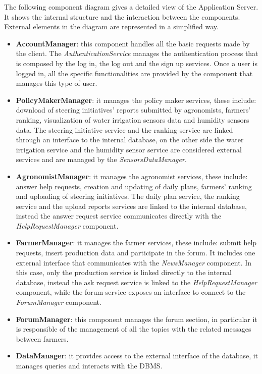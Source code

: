 \documentclass[table, 12pt]{article}
\begin{document}
The following component diagram gives a detailed view of the Application Server. It shows the internal structure and the interaction between the components.
External elements in the diagram are represented in a simplified way.
\begin{itemize}
    \item \textbf{AccountManager}: this component handles all the basic requests made by the client.
    The \textit{AuthenticationService} manages the authentication process that is composed by the log in, the log out and the sign up services. 
    Once a user is logged in, all the specific functionalities are provided by the component that manages this type of user.
    \item \textbf{PolicyMakerManager}: it manages the policy maker services, these include: download of steering initiatives' reports submitted by agronomists, farmers' ranking, visualization of water irrigation sensors data and humidity sensors data.
    The steering initiative service and the ranking service are linked through an interface to the internal database, on the other side the water irrigation service and the humidity sensor service are considered external services and are managed by the \textit{SensorsDataManager}.
    \item \textbf{AgronomistManager}: it manages the agronomist services, these include: answer help requests, creation and updating of daily plans, farmers' ranking and uploading of steering initiatives.
    The daily plan service, the ranking service and the upload reports services are linked to the internal database, instead the answer request service communicates directly with the \textit{HelpRequestManager} component.
    \item \textbf{FarmerManager}: it manages the farmer services, these include: submit help requests, insert production data and participate in the forum.
    It includes one external interface that communicates with the \textit{NewsManager} component.
    In this case, only the production service is linked directly to the internal database, instead the ask request service is linked to the \textit{HelpRequestManager} component, while the forum service exposes an interface to connect to the \textit{ForumManager} component.
    \item \textbf{ForumManager}: this component manages the forum section, in particular it is responsible of the management of all the topics with the related messages between farmers.
    \item \textbf{DataManager}: it provides access to the external interface of the database, it manages queries and interacts with the DBMS.

\end{itemize}
\end{document}
